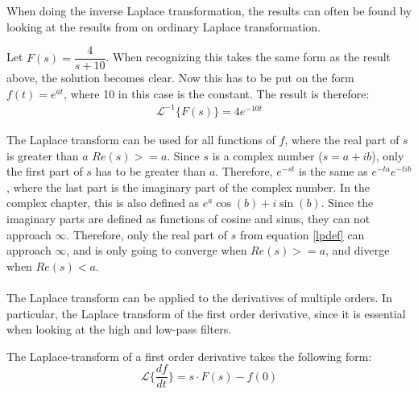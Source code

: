 When doing the inverse Laplace transformation, the results can often be found by looking at the results from on ordinary Laplace transformation.
\begin{tcolorbox}[colback=red!5!white,colframe=red!55!black,title=Example of an inverse Laplace transform]
Let $F(s) = \dfrac{4}{s+10}$. When recognizing this takes the same form as the result above, the solution becomes clear. Now this has to be put on the form $f(t)=e^{at}$, where 10 in this case is the constant. The result is therefore: \cite[p. 323]{diffandcomplex}
\begin{align}
\mathcal{L}^{-1}\{F(s)\} = 4e^{-10t}
\end{align}
\end{tcolorbox}
The Laplace transform can be used for all functions of $f$, where the real part of $s$ is greater than $a$ $Re(s)>=a$. Since $s$ is a complex number ($s=a+ib$), only the first part of $s$ has to be greater than $a$. Therefore, $e^{-st}$ is  the same as $e^{-ta}e^{-tib}$, where the last part is the imaginary part of the complex number. In the complex chapter, this is also defined as $e^{a}\cos(b)+ i \sin(b)$. Since the imaginary parts are defined as functions of cosine and sinus, they can not approach $\infty$. Therefore, only the real part of $s$ from equation \eqref{lpdef} can approach $\infty$, and is only going to converge when $Re(s) >= a$, and diverge when $Re(s)<a$.
\\ \\
The Laplace transform can be applied to the derivatives of multiple orders. In particular, the Laplace transform of the first order derivative, since it is essential when looking at the high and low-pass filters.
\begin{tcolorbox}[colback=green!5!white,colframe=green!40!black,title=Theorem 6.1: Laplace transform of a first order derivative]
The Laplace-transform of a first order derivative takes the following form:
$$\mathcal{L}\{\frac{df}{dt}\} = s\cdot F(s)-f(0)$$
\end{tcolorbox}

